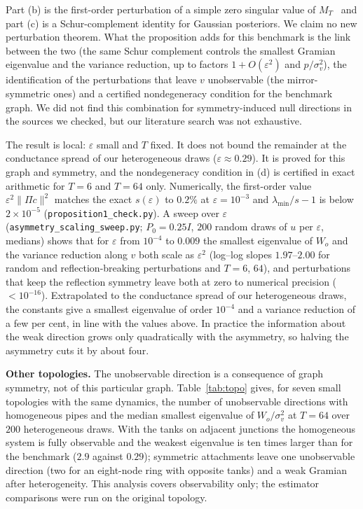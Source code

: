 \documentclass[conference]{IEEEtran}
\begin{document}
Part (b) is the first-order perturbation of a simple zero singular value of $M_T$~\cite{stewart1990} and part (c) is a Schur-complement identity for Gaussian posteriors. We claim no new perturbation theorem. What the proposition adds for this benchmark is the link between the two (the same Schur complement controls the smallest Gramian eigenvalue and the variance reduction, up to factors $1+O(\varepsilon^2)$ and $p/\sigma_v^2$), the identification of the perturbations that leave $v$ unobservable (the mirror-symmetric ones) and a certified nondegeneracy condition for the benchmark graph. We did not find this combination for symmetry-induced null directions in the sources we checked, but our literature search was not exhaustive.

The result is local: $\varepsilon$ small and $T$ fixed. It does not bound the remainder at the conductance spread of our heterogeneous draws ($\varepsilon\approx0.29$). It is proved for this graph and symmetry, and the nondegeneracy condition in (d) is certified in exact arithmetic for $T=6$ and $T=64$ only. Numerically, the first-order value $\varepsilon^2\|\Pi c\|^2$ matches the exact $s(\varepsilon)$ to $0.2\%$ at $\varepsilon=10^{-3}$ and $\lambda_{\min}/s-1$ is below $2\times10^{-5}$ (\texttt{proposition1\_check.py}). A sweep over $\varepsilon$ (\texttt{asymmetry\_scaling\_sweep.py}; $P_0=0.25I$, $200$ random draws of $u$ per $\varepsilon$, medians) shows that for $\varepsilon$ from $10^{-4}$ to $0.009$ the smallest eigenvalue of $W_o$ and the variance reduction along $v$ both scale as $\varepsilon^{2}$ (log--log slopes $1.97$--$2.00$ for random and reflection-breaking perturbations and $T=6$, $64$), and perturbations that keep the reflection symmetry leave both at zero to numerical precision ($<10^{-16}$). Extrapolated to the conductance spread of our heterogeneous draws, the constants give a smallest eigenvalue of order $10^{-4}$ and a variance reduction of a few per cent, in line with the values above. In practice the information about the weak direction grows only quadratically with the asymmetry, so halving the asymmetry cuts it by about four.

\textbf{Other topologies.} The unobservable direction is a consequence of graph symmetry, not of this particular graph. Table~\ref{tab:topo} gives, for seven small topologies with the same dynamics, the number of unobservable directions with homogeneous pipes and the median smallest eigenvalue of $W_o/\sigma_v^2$ at $T=64$ over $200$ heterogeneous draws. With the tanks on adjacent junctions the homogeneous system is fully observable and the weakest eigenvalue is ten times larger than for the benchmark ($2.9$ against $0.29$); symmetric attachments leave one unobservable direction (two for an eight-node ring with opposite tanks) and a weak Gramian after heterogeneity. This analysis covers observability only; the estimator comparisons were run on the original topology.
\end{document}
